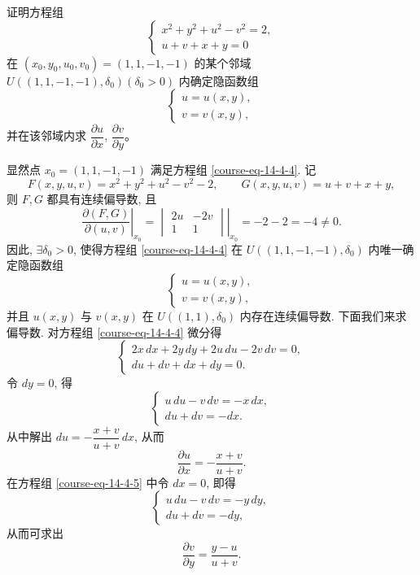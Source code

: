 \documentclass[UTF8,12pt,a4paper,fontset=fandol]{ctexart}
\begin{document}
\begin{example}\label{course-example-14-4-3}\quad 证明方程组
\begin{equation}
  \begin{cases}
    x^2+y^2+u^2-v^2=2,\\
    u+v+x+y=0
  \end{cases}
  \label{course-eq-14-4-4}
\end{equation}
在 $(x_0,y_0,u_0,v_0)=(1,1,-1,-1)$ 的某个邻域 $U((1,1,-1,-1),\delta_0)(\delta_0>0)$ 内确定隐函数组
\[
  \begin{cases}
    u=u(x,y),\\
    v=v(x,y),
  \end{cases}
\]
并在该邻域内求 $\dfrac{\partial u}{\partial x}$, $\dfrac{\partial v}{\partial y}$。

\end{example}
\begin{solve}\quad 显然点 $x_0=(1,1,-1,-1)$ 满足方程组 \eqref{course-eq-14-4-4}. 记
\[
  F(x,y,u,v)=x^2+y^2+u^2-v^2-2,
  \qquad
  G(x,y,u,v)=u+v+x+y,
\]
则 $F,G$ 都具有连续偏导数, 且
\[
  \left.
  \frac{\partial(F,G)}{\partial(u,v)}
  \right|_{x_0}
  =
  \left.
  \begin{vmatrix}
    2u & -2v\\
    1 & 1
  \end{vmatrix}
  \right|_{x_0}
  =-2-2=-4\ne0.
\]
因此, $\exists\delta_0>0$, 使得方程组 \eqref{course-eq-14-4-4}  在 $U((1,1,-1,-1),\delta_0)$ 内唯一确定隐函数组
\[
  \begin{cases}
    u=u(x,y),\\
    v=v(x,y),
  \end{cases}
\]
并且 $u(x,y)$ 与 $v(x,y)$ 在 $U((1,1),\delta_0)$ 内存在连续偏导数. 下面我们来求偏导数. 对方程组 \eqref{course-eq-14-4-4}  微分得
\begin{equation}
  \begin{cases}
    2x\,dx+2y\,dy+2u\,du-2v\,dv=0,\\
    du+dv+dx+dy=0.
  \end{cases}
  \label{course-eq-14-4-5}
\end{equation}
令 $dy=0$, 得
\[
  \begin{cases}
    u\,du-v\,dv=-x\,dx,\\
    du+dv=-dx.
  \end{cases}
\]
从中解出 $du=-\dfrac{x+v}{u+v}\,dx$, 从而
\[
  \frac{\partial u}{\partial x}=-\frac{x+v}{u+v}.
\]
在方程组 \eqref{course-eq-14-4-5}  中令 $dx=0$, 即得
\[
  \begin{cases}
    u\,du-v\,dv=-y\,dy,\\
    du+dv=-dy,
  \end{cases}
\]
从而可求出
\[
  \frac{\partial v}{\partial y}=\frac{y-u}{u+v}.
\]

\end{solve}
\end{document}
